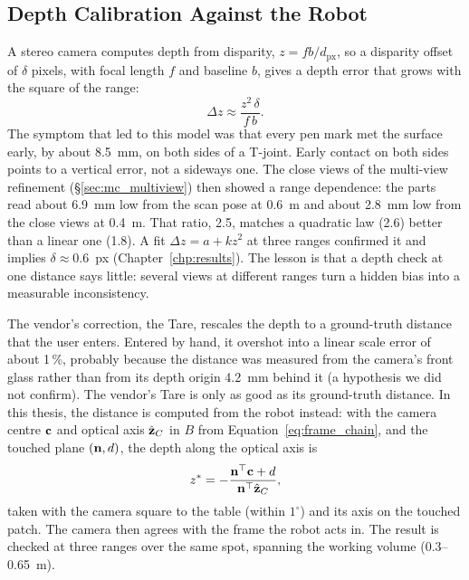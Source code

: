 \subsection{Depth Calibration Against the Robot}
\label{sec:mc_depth}
A stereo camera computes depth from disparity, $z=fb/d_{\mathrm{px}}$, so a disparity offset of
$\delta$ pixels, with focal length $f$ and baseline $b$, gives a depth error that grows with the
square of the range:
\begin{equation}
\Delta z \approx \frac{z^{2}\,\delta}{f\,b}.
\label{eq:depth_error}
\end{equation}
The symptom that led to this model was that every pen mark met the surface early, by about
8.5~mm, on both sides of a T-joint. Early contact on both sides points to a vertical error,
not a sideways one. The close views of the multi-view refinement (\S\ref{sec:mc_multiview})
then showed a range dependence: the parts read about 6.9~mm low from the scan pose at 0.6~m and
about 2.8~mm low from the close views at 0.4~m. That ratio, 2.5, matches a quadratic law (2.6)
better than a linear one (1.8). A fit $\Delta z=a+kz^2$ at three ranges confirmed it and implies
$\delta\approx0.6$~px (Chapter~\ref{chp:results}). The lesson is that a depth check at one
distance says little: several views at different ranges turn a hidden bias into a measurable
inconsistency.

The vendor's correction, the Tare, rescales the depth to a ground-truth distance that the user
enters. Entered by hand, it overshot into a linear scale error of about 1\,\%, probably because
the distance was measured from the camera's front glass rather than from its depth origin
4.2~mm behind it (a hypothesis we did not confirm). The vendor's Tare is only as good as its
ground-truth distance. In this thesis, the distance is computed from the robot instead: with the
camera centre $\mathbf{c}$ and optical axis $\hat{\mathbf{z}}_C$ in $B$ from
Equation~\ref{eq:frame_chain}, and the touched plane $(\mathbf{n},d)$, the depth along the optical
axis is
\begin{equation}
z^{*}=-\frac{\mathbf{n}^{\top}\mathbf{c}+d}{\mathbf{n}^{\top}\hat{\mathbf{z}}_C},
\label{eq:tare_distance}
\end{equation}
taken with the camera square to the table (within $1^\circ$) and its axis on the touched patch.
The camera then agrees with the frame the robot acts in. The result is checked at three ranges
over the same spot, spanning the working volume (0.3--0.65~m).

